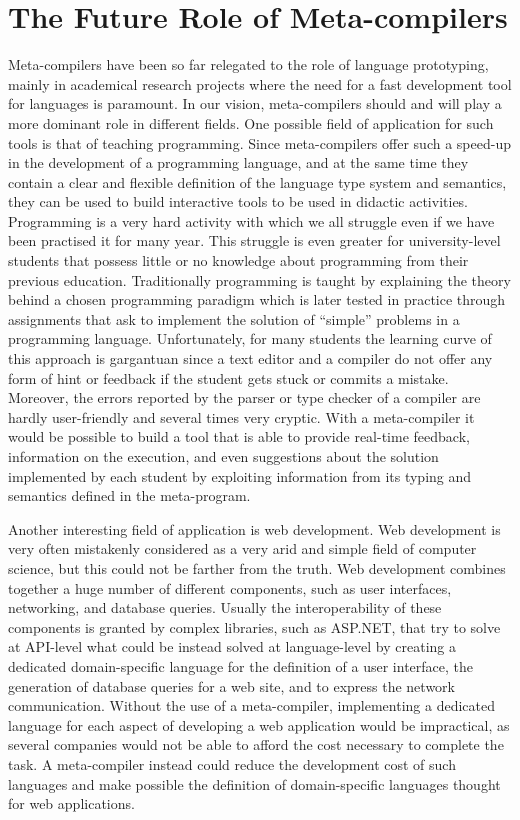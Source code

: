 \section{The Future Role of Meta-compilers}
\label{sec:ch_conclusion_future}
Meta-compilers have been so far relegated to the role of language prototyping, mainly in academical research projects where the need for a fast development tool for languages is paramount. In our vision, meta-compilers should and will play a more dominant role in different fields. One possible field of application for such tools is that of teaching programming. Since meta-compilers offer such a speed-up in the development of a programming language, and at the same time they contain a clear and flexible definition of the language type system and semantics, they can be used to build interactive tools to be used in didactic activities. Programming is a very hard activity with which we all struggle even if we have been practised it for many year. This struggle is even greater for university-level students that possess little or no knowledge about programming from their previous education. Traditionally programming is taught by explaining the theory behind a chosen programming paradigm which is later tested in practice through assignments that ask to implement the solution of ``simple'' problems in a programming language. Unfortunately, for many students the learning curve of this approach is gargantuan since a text editor and a compiler do not offer any form of hint or feedback if the student gets stuck or commits a mistake. Moreover, the errors reported by the parser or type checker of a compiler are hardly user-friendly and several times very cryptic. With a meta-compiler it would be possible to build a tool that is able to provide real-time feedback, information on the execution, and even suggestions about the solution implemented by each student by exploiting information from its typing and semantics defined in the meta-program.

Another interesting field of application is web development. Web development is very often mistakenly considered as a very arid and simple field of computer science, but this could not be farther from the truth. Web development combines together a huge number of different components, such as user interfaces, networking, and database queries. Usually the interoperability of these components is granted by complex libraries, such as ASP.NET, that try to solve at API-level what could be instead solved at language-level by creating a dedicated domain-specific language for the definition of a user interface, the generation of database queries for a web site, and to express the network communication. Without the use of a meta-compiler, implementing a dedicated language for each aspect of developing a web application would be impractical, as several companies would not be able to afford the cost necessary to complete the task. A meta-compiler instead could reduce the development cost of such languages and make possible the definition of domain-specific languages thought for web applications.

